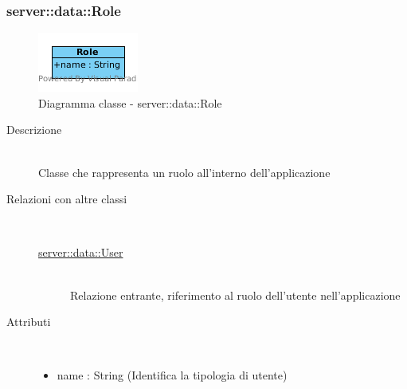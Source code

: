 \vspace{0.5cm}
\hypertarget{server::data::Role}{}
\subsubsection[Role]{server::data::Role}
\begin{center}
			\begin{figure}[H]
				\centering \includegraphics[scale=4, max width=\textwidth, max height=\myheight]{../img/diagrammiClassi/server/data/Role.png}
				\caption{Diagramma classe - server::data::Role}
			\end{figure}
		\end{center}\begin{description}
\item[Descrizione] \hfill \\
 Classe che rappresenta un ruolo all'interno dell'applicazione
\item[Relazioni con altre classi] \hfill \\
 \vspace{-7mm}
\begin{description}
\item[\hyperlink{server::data::User}{server::data::User}] \hfill \\
 Relazione entrante, riferimento al ruolo dell'utente nell'applicazione
\end{description}

\item[Attributi] \hfill \\
 \vspace{-7mm}
\begin{itemize}
\item name : String (Identifica la tipologia di utente)
\end{itemize}

\end{description}


